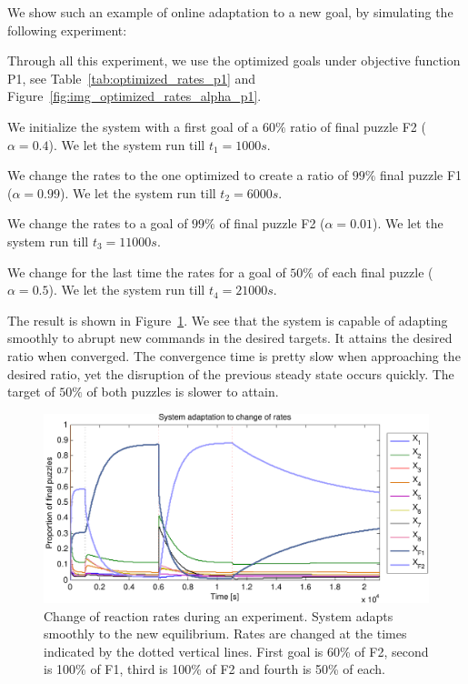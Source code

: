 		We show such an example of online adaptation to a new goal, by simulating the following experiment:
		
		\begin{my_itemize}
			\item Through all this experiment, we use the optimized goals under objective function P1, see Table~\ref{tab:optimized_rates_p1} and Figure~\ref{fig:img_optimized_rates_alpha_p1}.
			\item We initialize the system with a first goal of a $60\%$ ratio of final puzzle F2 ($\alpha=0.4$). We let the system run till $t_1 = 1000 s$.
			\item We change the rates to the one optimized to create a ratio of $99\%$ final puzzle F1 ($\alpha=0.99$). We let the system run till $t_2 = 6000 s$.
			\item We change the rates to a goal of $99\%$ of final puzzle F2 ($\alpha=0.01$). We let the system run till $t_3 = 11000 s$.
			\item We change for the last time the rates for a goal of $50\%$ of each final puzzle ($\alpha=0.5$). We let the system run till $t_4 = 21000 s$.
		\end{my_itemize}
		
		The result is shown in Figure~\ref{fig:optim_online_adaptation}. We see that the system is capable of adapting smoothly to abrupt new commands in the desired targets. It attains the desired ratio when converged. The convergence time is pretty slow when approaching the desired ratio, yet the disruption of the previous steady state occurs quickly. The target of $50\%$ of both puzzles is slower to attain.
				
	\begin{figure}[h!]
		\centering
			\includegraphics[width=13cm]{img/optim_online_adaptation.pdf}
		\caption{Change of reaction rates during an experiment. System adapts smoothly to the new equilibrium. Rates are changed at the times indicated by the dotted vertical lines. First goal is 60\% of F2, second is 100\% of F1, third is 100\% of F2 and fourth is 50\% of each.}
		\label{fig:optim_online_adaptation}
	\end{figure}
	
